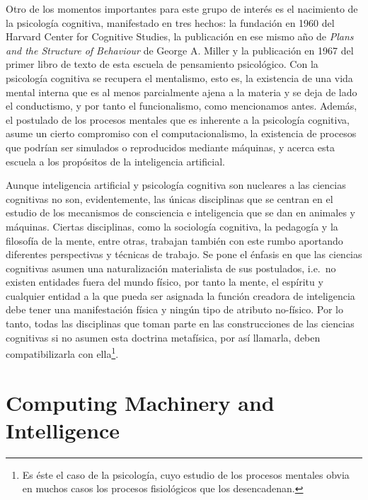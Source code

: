 \documentclass[12pt]{memoir}
\begin{document}
Otro de los momentos importantes para este grupo de interés es el nacimiento de la psicología cognitiva, manifestado en tres hechos: la fundación en 1960 del Harvard Center for Cognitive Studies, la publicación en ese mismo año de \textit{Plans and the Structure of Behaviour} de George A. Miller y la publicación en 1967 del primer libro de texto de esta escuela de pensamiento psicológico. Con la psicología cognitiva se recupera el mentalismo, esto es, la existencia de una vida mental interna que es al menos parcialmente ajena a la materia y se deja de lado el conductismo, y por tanto el funcionalismo, como mencionamos antes. Además, el postulado de los procesos mentales que es inherente a la psicología cognitiva, asume un cierto compromiso con el computacionalismo, la existencia de procesos que podrían ser simulados o reproducidos mediante máquinas, y acerca esta escuela a los propósitos de la inteligencia artificial.

Aunque inteligencia artificial y psicología cognitiva son nucleares a las ciencias cognitivas no son, evidentemente, las únicas disciplinas que se centran en el estudio de los mecanismos de consciencia e inteligencia que se dan en animales y máquinas. Ciertas disciplinas, como la sociología cognitiva, la pedagogía y la filosofía de la mente, entre otras, trabajan también con este rumbo aportando diferentes perspectivas y técnicas de trabajo. Se pone el énfasis en que las ciencias cognitivas asumen una naturalización materialista de sus postulados, i.e.\ no existen entidades fuera del mundo físico, por tanto la mente, el espíritu y cualquier entidad a la que pueda ser asignada la función creadora de inteligencia debe tener una manifestación física y ningún tipo de atributo no-físico. Por lo tanto, todas las disciplinas que toman parte en las construcciones de las ciencias cognitivas si no asumen esta doctrina metafísica, por así llamarla, deben compatibilizarla con ella\footnote{Es éste el caso de la psicología, cuyo estudio de los procesos mentales obvia en muchos casos los procesos fisiológicos que los desencadenan.}.

\section{Computing Machinery and Intelligence}
\end{document}
